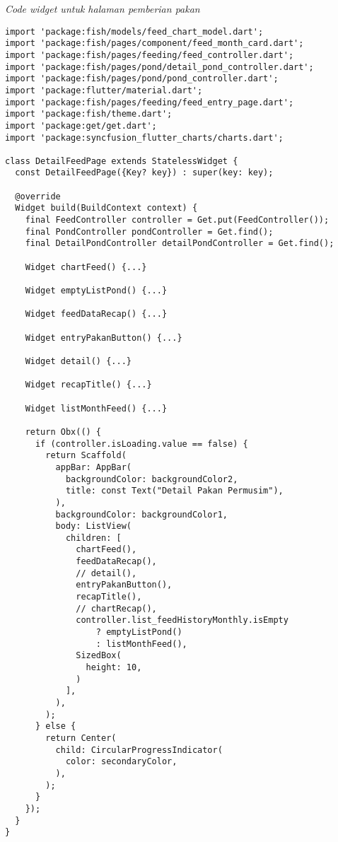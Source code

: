 	\textit{Code widget untuk halaman pemberian pakan}
	\begin{lstlisting}
import 'package:fish/models/feed_chart_model.dart';
import 'package:fish/pages/component/feed_month_card.dart';
import 'package:fish/pages/feeding/feed_controller.dart';
import 'package:fish/pages/pond/detail_pond_controller.dart';
import 'package:fish/pages/pond/pond_controller.dart';
import 'package:flutter/material.dart';
import 'package:fish/pages/feeding/feed_entry_page.dart';
import 'package:fish/theme.dart';
import 'package:get/get.dart';
import 'package:syncfusion_flutter_charts/charts.dart';

class DetailFeedPage extends StatelessWidget {
  const DetailFeedPage({Key? key}) : super(key: key);

  @override
  Widget build(BuildContext context) {
    final FeedController controller = Get.put(FeedController());
    final PondController pondController = Get.find();
    final DetailPondController detailPondController = Get.find();

    Widget chartFeed() {...}

    Widget emptyListPond() {...}

    Widget feedDataRecap() {...}

    Widget entryPakanButton() {...}

    Widget detail() {...}

    Widget recapTitle() {...}

    Widget listMonthFeed() {...}

    return Obx(() {
      if (controller.isLoading.value == false) {
        return Scaffold(
          appBar: AppBar(
            backgroundColor: backgroundColor2,
            title: const Text("Detail Pakan Permusim"),
          ),
          backgroundColor: backgroundColor1,
          body: ListView(
            children: [
              chartFeed(),
              feedDataRecap(),
              // detail(),
              entryPakanButton(),
              recapTitle(),
              // chartRecap(),
              controller.list_feedHistoryMonthly.isEmpty
                  ? emptyListPond()
                  : listMonthFeed(),
              SizedBox(
                height: 10,
              )
            ],
          ),
        );
      } else {
        return Center(
          child: CircularProgressIndicator(
            color: secondaryColor,
          ),
        );
      }
    });
  }
}

	\end{lstlisting}

